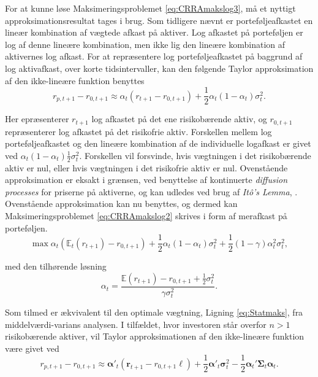 \documentclass[
  a4paper,
  oneside]{memoir}
\begin{document}
For at kunne løse Maksimeringsproblemet \eqref{eq:CRRAmakslog3}, må et nyttigt approksimationsresultat tages i brug. Som tidligere nævnt er porteføljeafkastet en lineær kombination af vægtede afkast på aktiver. Log afkastet på porteføljen er log af denne lineære kombination, men ikke lig den lineære kombination af aktivernes log afkast. For at repræsentere log porteføljeafkastet på baggrund af log aktivafkast, over korte tidsintervaller, kan den følgende Taylor approksimation af den ikke-lineære funktion benyttes
\[r_{p,t+1}-r_{0,t+1}\approx \alpha_t (r_{t+1}-r_{0,t+1})+\frac{1}{2}\alpha_t(1-\alpha_t)\sigma_t^2.\]

Her epræsenterer \(r_{t+1}\) log afkastet på det ene risikobærende aktiv, og \(r_{0,t+1}\) repræsenterer log afkastet på det risikofrie aktiv. Forskellen mellem log porteføljeafkastet og den lineære kombination af de individuelle logafkast er givet ved \(\alpha_t(1-\alpha_t)\tfrac{1}{2}\sigma_t^2\). Forskellen vil forsvinde, hvis vægtningen i det risikobærende aktiv er nul, eller hvis vægtningen i det risikofrie aktiv er nul. Ovenstående approksimation er eksakt i grænsen, ved benyttelse af kontinuerte \emph{diffusion processes} for priserne på aktiverne, og kan udledes ved brug af \emph{Itô's Lemma}, \citep{CampVicCha2003}. Ovenstående approksimation kan nu benyttes, og dermed kan Maksimeringsproblemet \eqref{eq:CRRAmakslog2} skrives i form af merafkast på porteføljen.
\begin{equation}
\max\alpha_t(\mathbb{E}_t(r_{t+1}) - r_{0,t+1}) + \frac{1}{2}\alpha_t(1-\alpha_t)\sigma_t^2 + \frac{1}{2}(1-\gamma)\alpha_t^2\sigma_t^2, \label{eq:CRRAmakslog4} 
\end{equation}

med den tilhørende løsning
\begin{equation}
\alpha_t=\frac{\mathbb{E}(r_{t+1}) - r_{0,t+1}+\frac{1}{2}\sigma_t^2}{\gamma\sigma_t^2}.
\end{equation}

Som tilmed er ækvivalent til den optimale vægtning, Ligning \eqref{eq:Statmaks}, fra middelværdi-varians analysen. I tilfældet, hvor investoren står overfor \(n>1\) risikobærende aktiver, vil Taylor approksimationen af den ikke-lineære funktion være givet ved
\begin{equation}
r_{p,t+1}-r_{0,t+1}\approx \bm{\alpha}'_t (\bm{r}_{t+1}-r_{0,t+1}\bm{\ell})+\frac{1}{2}\bm{\alpha}'_t\bm{\sigma}_t^2 - \frac{1}{2} \bm{\alpha}_t'\bm{\Sigma}_t\bm{\alpha}_t. \label{eq:Multtaylor}
\end{equation}
\end{document}
